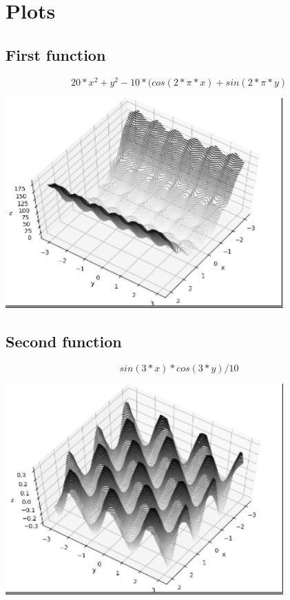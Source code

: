 \documentclass[a4paper, 12pt]{article}
\begin{document}
\section{Plots}

\subsection{First function} 

\[20*x^2 + y^2 - 10*(cos(2 * \pi * x) + sin(2 * \pi * y) \]

\begin{center}
	\includegraphics[width=0.8\textwidth]{fit_fun.png} \par
\end{center}

\newpage
\subsection{Second function}

\[sin(3*x) * cos(3*y) / 10\]

\begin{center}
	\includegraphics[width=0.8\textwidth]{sec_fun.png} \par
\end{center}
\end{document}
